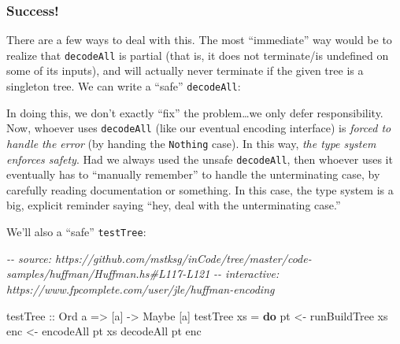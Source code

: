 \documentclass[]{article}
\newenvironment{Shaded}{}{}
\newcommand{\CommentTok}[1]{\textcolor[rgb]{0.38,0.63,0.69}{\textit{#1}}}
\newcommand{\DataTypeTok}[1]{\textcolor[rgb]{0.56,0.13,0.00}{#1}}
\newcommand{\KeywordTok}[1]{\textcolor[rgb]{0.00,0.44,0.13}{\textbf{#1}}}
\newcommand{\NormalTok}[1]{#1}
\newcommand{\OperatorTok}[1]{\textcolor[rgb]{0.40,0.40,0.40}{#1}}
\newcommand{\OtherTok}[1]{\textcolor[rgb]{0.00,0.44,0.13}{#1}}
\begin{document}
\hypertarget{success}{%
\subsubsection{Success!}\label{success}}

There are a few ways to deal with this. The most ``immediate'' way would be to
realize that \texttt{decodeAll} is partial (that is, it does not terminate/is
undefined on some of its inputs), and will actually never terminate if the given
tree is a singleton tree. We can write a ``safe'' \texttt{decodeAll}:

\begin{Shaded}
\end{Shaded}

In doing this, we don't exactly ``fix'' the problem\ldots we only defer
responsibility. Now, whoever uses \texttt{decodeAll\textquotesingle{}} (like our
eventual encoding interface) is \emph{forced to handle the error} (by handing
the \texttt{Nothing} case). In this way, \emph{the type system enforces safety}.
Had we always used the unsafe \texttt{decodeAll}, then whoever uses it
eventually has to ``manually remember'' to handle the unterminating case, by
carefully reading documentation or something. In this case, the type system is a
big, explicit reminder saying ``hey, deal with the unterminating case.''

We'll also a ``safe'' \texttt{testTree}:

\begin{Shaded}
\begin{Highlighting}[]
\CommentTok{{-}{-} source: https://github.com/mstksg/inCode/tree/master/code{-}samples/huffman/Huffman.hs\#L117{-}L121}
\CommentTok{{-}{-} interactive: https://www.fpcomplete.com/user/jle/huffman{-}encoding}

\OtherTok{testTree\textquotesingle{} ::} \DataTypeTok{Ord}\NormalTok{ a }\OtherTok{=>}\NormalTok{ [a] }\OtherTok{{-}>} \DataTypeTok{Maybe}\NormalTok{ [a]}
\NormalTok{testTree\textquotesingle{} xs }\OtherTok{=} \KeywordTok{do}
\NormalTok{    pt  }\OtherTok{<{-}}\NormalTok{ runBuildTree xs}
\NormalTok{    enc }\OtherTok{<{-}}\NormalTok{ encodeAll pt xs}
\NormalTok{    decodeAll\textquotesingle{} pt enc}
\end{Highlighting}
\end{Shaded}
\end{document}
